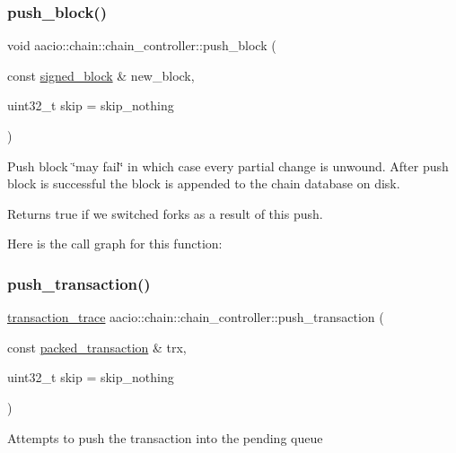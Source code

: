 \subsubsection{\texorpdfstring{push\+\_\+block()}{push\_block()}}
{\footnotesize\ttfamily void aacio\+::chain\+::chain\+\_\+controller\+::push\+\_\+block (\begin{DoxyParamCaption}\item[{const \mbox{\hyperlink{structaacio_1_1chain_1_1signed__block}{signed\+\_\+block}} \&}]{new\+\_\+block,  }\item[{uint32\+\_\+t}]{skip = {\ttfamily skip\+\_\+nothing} }\end{DoxyParamCaption})}

Push block \char`\"{}may fail\char`\"{} in which case every partial change is unwound. After push block is successful the block is appended to the chain database on disk.

\begin{DoxyReturn}{Returns}
true if we switched forks as a result of this push. 
\end{DoxyReturn}
Here is the call graph for this function\+:
\mbox{\label{classaacio_1_1chain_1_1chain__controller_a9420fb823ef7fbd0a5745593fdc1aee7}} 
\subsubsection{\texorpdfstring{push\+\_\+transaction()}{push\_transaction()}}
{\footnotesize\ttfamily \mbox{\hyperlink{structaacio_1_1chain_1_1transaction__trace}{transaction\+\_\+trace}} aacio\+::chain\+::chain\+\_\+controller\+::push\+\_\+transaction (\begin{DoxyParamCaption}\item[{const \mbox{\hyperlink{structaacio_1_1chain_1_1packed__transaction}{packed\+\_\+transaction}} \&}]{trx,  }\item[{uint32\+\_\+t}]{skip = {\ttfamily skip\+\_\+nothing} }\end{DoxyParamCaption})}

Attempts to push the transaction into the pending queue

